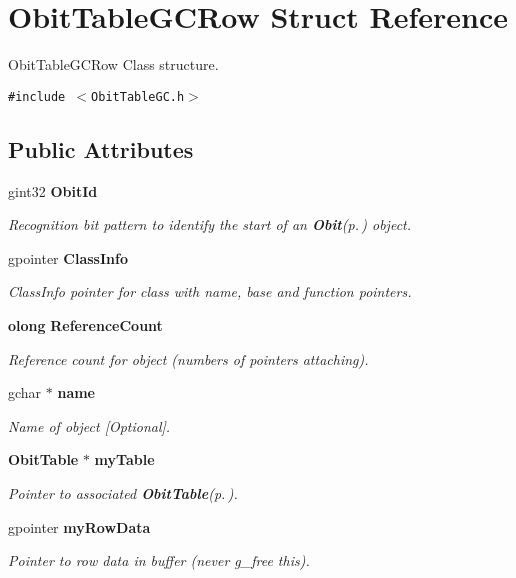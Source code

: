 \section{Obit\-Table\-GCRow Struct Reference}
\label{structObitTableGCRow}
Obit\-Table\-GCRow Class structure.  


{\tt \#include $<$Obit\-Table\-GC.h$>$}

\subsection*{Public Attributes}
\begin{CompactItemize}
\item 
gint32 {\bf Obit\-Id}
\begin{CompactList}\small\item\em Recognition bit pattern to identify the start of an {\bf Obit}{\rm (p.\,\pageref{structObit})} object. \item\end{CompactList}\item 
gpointer {\bf Class\-Info}
\begin{CompactList}\small\item\em Class\-Info pointer for class with name, base and function pointers. \item\end{CompactList}\item 
{\bf olong} {\bf Reference\-Count}
\begin{CompactList}\small\item\em Reference count for object (numbers of pointers attaching). \item\end{CompactList}\item 
gchar $\ast$ {\bf name}
\begin{CompactList}\small\item\em Name of object [Optional]. \item\end{CompactList}\item 
{\bf Obit\-Table} $\ast$ {\bf my\-Table}
\begin{CompactList}\small\item\em Pointer to associated {\bf Obit\-Table}{\rm (p.\,\pageref{structObitTable})}. \item\end{CompactList}\item 
gpointer {\bf my\-Row\-Data}
\begin{CompactList}\small\item\em Pointer to row data in buffer (never g\_\-free this). \item\end{CompactList}\item 

\end{CompactItemize}
